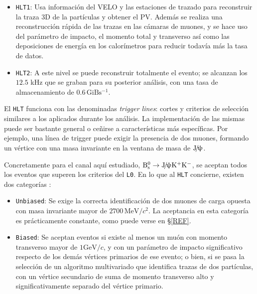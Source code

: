 \begin{itemize}
  \item \texttt{HLT1}: Usa información del VELO y las estaciones de trazado para reconstruir la traza 3D de la partículas y obtener el PV. Además se realiza una reconstrucción rápida de las trazas en las cámaras de muones, y se hace uso del parámetro de impacto, el momento total y transverso así como las deposiciones de energía en los calorímetros para reducir todavía más la tasa de datos.
  \item \texttt{HLT2}: A este nivel se puede reconstruir  totalmente el evento; se alcanzan los $12.5$ kHz que se graban para su posterior análisis, con una tasa de almacenamiento de $0.6 \, \mathrm{GiB s^{-1}}$.
\end{itemize}

\color{dieg}
El \texttt{HLT} funciona con las denominadas \emph{trigger lines}: cortes y criterios de selección similares a los aplicados durante los análisis. La implementación de las mismas puede ser bastante general o ceñirse a características más específicas. Por ejemplo, una línea de trigger puede exigir la presencia de dos muones, formando un vértice con una masa invariante en la ventana de masa de $\text{J}\!/\!\uppsi$. \color{norm}

 

Concretamente para el canal aquí estudiado, $\text{B}{}_{\text{s}}^{\text{0}} \to \text{J}\!/\!\uppsi \text{K}{}^{+}\text{K}{}^{-}$, se aceptan todos los eventos que superen los criterios del \texttt{L0}. En  lo que al \texttt{HLT} concierne, existen dos categorías \cite{paperPhis}:
\begin{itemize}
  \item \texttt{Unbiased}: Se exige la correcta identificación de dos muones de carga opuesta con masa invariante mayor de $2700 \,\mathrm{MeV/}c^2$. La aceptancia en esta categoría es prácticamente constante, como puede verse en \S \ref{REF}.
  \item \texttt{Biased}: Se aceptan eventos si existe al menos un muón con momento transverso mayor de $1 \mathrm{GeV/}c$, y con un parámetro de impacto significativo respecto de los demás vértices primarios de ese evento; o bien, si se pasa la selección de un algoritmo multivariado que  identifica trazas de dos partículas, con un vértice secundario de suma de momento transverso alto y significativamente separado del vértice primario.
\end{itemize}





